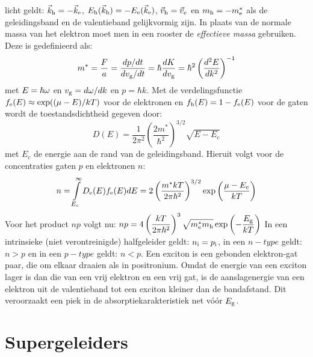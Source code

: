\documentclass[twoside]{report}
\begin{document}
licht geldt: $\vec{k}_{\rm h}=-\vec{k}_{\rm e}$,
$E_{\rm h}(\vec{k}_{\rm h})=-E_{\rm e}(\vec{k}_{\rm e})$,
$\vec{v}_{\rm h}=\vec{v}_{\rm e}$ en $m_{\rm h}=-m_{\rm e}^*$ als de geleidingsband
en de valentieband gelijkvormig zijn.
\npar
In plaats van de normale massa van het elektron moet men in een rooster de
{\em effectieve massa} gebruiken. Deze is gedefinieerd als:
\[
m^*=\frac{F}{a}=\frac{dp/dt}{dv_{\rm g}/dt}=\hbar\frac{dK}{dv_{\rm g}}=
\hbar^2\left(\frac{d^2E}{dk^2}\right)^{-1}
\]
met $E=\hbar\omega$ en $v_{\rm g}=d\omega/dk$ en $p=\hbar k$.
\npar
Met de verdelingsfunctie $f_{\rm e}(E)\approx\exp((\mu-E)/kT)$ voor de
elektronen en $f_{\rm h}(E)=1-f_{\rm e}(E)$ voor de gaten wordt de
toestandsdichtheid gegeven door:
\[
D(E)=\frac{1}{2\pi^2}\left(\frac{2m^*}{\hbar^2}\right)^{3/2}\sqrt{E-E_c}
\]
met $E_c$ de energie aan de rand van de geleidingsband. Hieruit volgt voor de
concentraties gaten $p$ en elektronen $n$:
\[
n=\int\limits_{E_c}^{\infty}D_{\rm e}(E)f_{\rm e}(E)dE=2\left(\frac{m^*kT}{2\pi\hbar^2}
\right)^{3/2}\exp\left(\frac{\mu-E_c}{kT}\right)
\]
Voor het product $np$ volgt nu:
$\displaystyle np=4\left(\frac{kT}{2\pi\hbar^2}\right)^3
\sqrt{m^*_{\rm e}m_{\rm h}}\exp\left(-\frac{E_{\rm g}}{kT}\right)$
\npar
In een intrinsieke (niet verontreinigde) halfgeleider geldt: $n_{\rm i}=
p_{\rm i}$, in een $n-type$ geldt: $n>p$ en in een $p-type$ geldt: $n<p$.
\npar
Een exciton is een gebonden elektron-gat paar, die om elkaar draaien als in
positronium. Omdat de energie van een exciton lager is dan die van een
vrij elektron en een vrij gat, is de aanslagenergie van een elektron uit de
valentieband tot een exciton kleiner dan de bandafstand. Dit veroorzaakt een
piek in de absorptiekarakteristiek net v\'o\'or $E_{\rm g}$.

\section{Supergeleiders}
\end{document}

